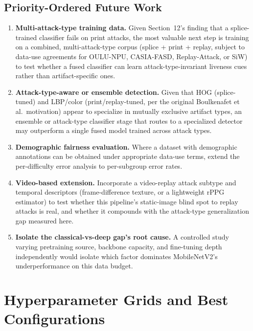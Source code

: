 \documentclass[11pt]{article}
\begin{document}
\subsection{Priority-Ordered Future Work}

\begin{enumerate}
\item \textbf{Multi-attack-type training data.} Given Section~12's finding that a splice-trained classifier fails on print attacks, the most valuable next step is training on a combined, multi-attack-type corpus (splice + print + replay, subject to data-use agreements for OULU-NPU, CASIA-FASD, Replay-Attack, or SiW) to test whether a fused classifier can learn attack-type-invariant liveness cues rather than artifact-specific ones.
\item \textbf{Attack-type-aware or ensemble detection.} Given that HOG (splice-tuned) and LBP/color (print/replay-tuned, per the original Boulkenafet et al.\ motivation) appear to specialize in mutually exclusive artifact types, an ensemble or attack-type classifier stage that routes to a specialized detector may outperform a single fused model trained across attack types.
\item \textbf{Demographic fairness evaluation.} Where a dataset with demographic annotations can be obtained under appropriate data-use terms, extend the per-difficulty error analysis to per-subgroup error rates.
\item \textbf{Video-based extension.} Incorporate a video-replay attack subtype and temporal descriptors (frame-difference texture, or a lightweight rPPG estimator) to test whether this pipeline's static-image blind spot to replay attacks is real, and whether it compounds with the attack-type generalization gap measured here.
\item \textbf{Isolate the classical-vs-deep gap's root cause.} A controlled study varying pretraining source, backbone capacity, and fine-tuning depth independently would isolate which factor dominates MobileNetV2's underperformance on this data budget.
\end{enumerate}

\appendix
\section{Hyperparameter Grids and Best Configurations}
\end{document}
